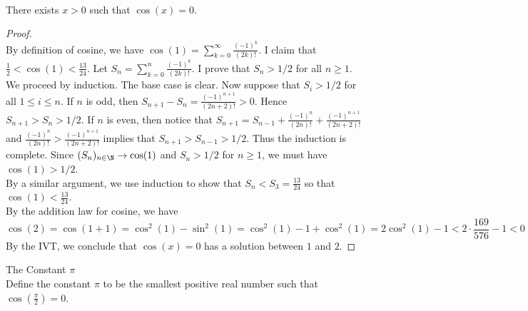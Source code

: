 \documentclass[a4paper]{article}
\begin{document}
\begin{prp}{}{}\\
There exists $x>0$ such that $\cos(x)=0$. 
\begin{proof}\\
By definition of cosine, we have $\cos(1)=\sum_{k=0}^\infty\frac{(-1)^k}{(2k)!}$. I claim that $\frac{1}{2}<\cos(1)<\frac{13}{24}$. Let $S_n=\sum_{k=0}^n\frac{(-1)^k}{(2k)!}$. I prove that $S_n>1/2$ for all $n\geq1$. We proceed by induction. The base case is clear. Now suppose that $S_i>1/2$ for all $1\leq i\leq n$. If $n$ is odd, then $S_{n+1}-S_n=\frac{(-1)^{n+1}}{(2n+2)!}>0$. Hence $S_{n+1}>S_n>1/2$. If $n$ is even, then notice that $S_{n+1}=S_{n-1}+\frac{(-1)^n}{(2n)!}+\frac{(-1)^{n+1}}{(2n+2)!}$ and $\frac{(-1)^n}{(2n)!}>\frac{(-1)^{n+1}}{(2n+2)!}$ implies that $S_{n+1}>S_{n-1}>1/2$. Thus the induction is complete. Since $(S_n)_{n\in\N}\to\cos(1)$ and $S_n>1/2$ for $n\geq 1$, we must have $\cos(1)>1/2$. \\

By a similar argument, we use induction to show that $S_n<S_3=\frac{13}{24}$ so that $\cos(1)<\frac{13}{24}$. \\

By the addition law for cosine, we have $$\cos(2)=\cos(1+1)=\cos^2(1)-\sin^2(1)=\cos^2(1)-1+\cos^2(1)=2\cos^2(1)-1<2\cdot\frac{169}{576}-1<0$$ By the IVT, we conclude that $\cos(x)=0$ has a solution between $1$ and $2$. 
\end{proof}
\end{prp}

\begin{defn}{The Constant $\pi$}{}\\
Define the constant $\pi$ to be the smallest positive real number such that $\cos\left(\frac{\pi}{2}\right)=0$. 
\end{defn}
\end{document}
